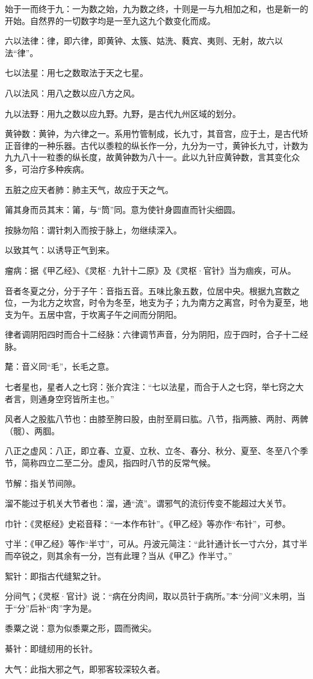 \documentclass[12pt]{ctexbook}%
\begin{document}
\begin{jiaozhu}
	\item 始于一而终于九：一为数之始，九为数之终，十则是一与九相加之和，也是新一的开始。自然界的一切数字均是一至九这九个数变化而成。
	\item 六以法律：律，即六律，即黄钟、太簇、姑洗、蕤宾、夷则、无射，故六以法“律”。
	\item 七以法星：用七之数取法于天之七星。
	\item 八以法风：用八之数以应八方之风。
	\item 九以法野：用九之数以应九野。九野，是古代九州区域的划分。
	\item 黄钟数：黄钟，为六律之一。系用竹管制成，长九寸，其音宫，应于土，是古代矫正音律的一种乐器。古代以黍粒的纵长作一分，九分为一寸，黄钟长九寸，计数为九九八十一粒黍的纵长度，故黄钟数为八十一。此以九针应黄钟数，言其变化众多，可治疗多种疾病。
	\item 五脏之应天者肺：肺主天气，故应于天之气。
	\item 𥮉其身而员其末：𥮉，与“筒”同。意为使针身圆直而针尖细圆。
	\item 按脉勿陷：谓针刺入而按于脉上，勿继续深入。
	\item 以致其气：以诱导正气到来。
	\item 瘤病：据《甲乙经》、《灵枢·九针十二原》及《灵枢·官针》当为痼疾，可从。
	\item 音者冬夏之分，分于子午：音指五音。五味比象五数，位居中央。根据九宫数之位，一为北方之坎宫，时令为冬至，地支为子；九为南方之离宫，时令为夏至，地支为午。五居中宫，于坎离子午之间而分阴阳。
	\item 律者调阴阳四时而合十二经脉：六律调节声音，分为阴阳，应于四时，合子十二经脉。
	\item 氂：音义同“毛”，长毛之意。
	\item 七者星也，星者人之七窍：张介宾注：“七以法星，而合于人之七窍，举七窍之大者言，则通身空窍皆所主也。”
	\item 风者人之股肱八节也：由膝至胯曰股，由肘至肩曰肱。八节，指两腋、两肘、两髀（髋）、两腘。
	\item 八正之虚风：八正，即立春、立夏、立秋、立冬、春分、秋分、夏至、冬至八个季节，简称四立二至二分。虚风，指四时八节的反常气候。
	\item 节解：指关节间隙。
	\item 溜不能过于机关大节者也：溜，通“流”。谓邪气的流衍传变不能超过大关节。
	\item 巾针：《灵枢经》史崧音释：“一本作布针”。《甲乙经》等亦作“布针”，可参。
	\item 寸半：《甲乙经》等作“半寸”，可从。丹波元简注：“此针通计长一寸六分，其寸半而卒锐之，则其余有一分，岂有此理？当从《甲乙》作半寸。”
	\item 絮针：即指古代缝絮之针。
	\item 分间气；《灵枢·官计》说：“病在分肉间，取以员针于病所。”本“分间”义未明，当于“分”后补“肉”字为是。
	\item 黍粟之说：意为似黍粟之形，圆而微尖。
	\item 綦针：即缝纫用的长针。
	\item 大气：此指大邪之气，即邪客较深较久者。
\end{jiaozhu}
\end{document}
